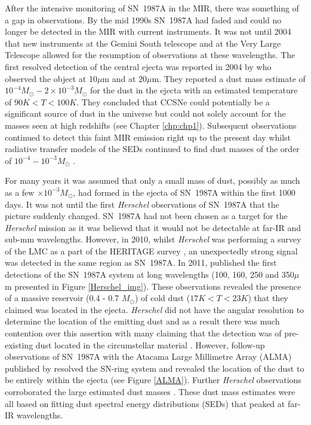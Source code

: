 After the intensive monitoring of SN~1987A in the MIR, there was something of a gap in observations.  By the mid 1990s SN~1987A had faded and could no longer be detected in the MIR with current instruments.  It was not until 2004 that new instruments at the Gemini South telescope and at the Very Large Telescope allowed for the resumption of observations at these wavelengths.  The first resolved detection of the central ejecta was reported in 2004 by \citet{Bouchet2004} who observed the object at 10$\mu$m and at $20\mu$m. They reported a dust mass estimate of $10^{-4}M_{\odot}-2 \times 10^{-3}M_{\odot}$ for the dust in the ejecta with an estimated temperature of $90K<T<100K$.  They concluded that CCSNe could potentially be a significant source of dust in the universe but could not solely account for the masses seen at high redshifts (see Chapter \ref{chp:chp1}).  Subsequent observations continued to detect this faint MIR emission right up to the present day \citep{Dwek2010,Bouchet2014} whilst radiative transfer models of the SEDs continued to find dust masses of the order of $10^{-4}-10^{-3}M_{\odot}$ \citep{Ercolano2007}.

For many years it was assumed that only a small mass of dust, possibly as much as a few $\times 10^{-3}M_{\odot}$, had formed in the ejecta of SN~1987A within the first 1000 days.  It was not until the first \textit{Herschel} observations of SN~1987A that the picture suddenly changed.  SN~1987A had not been chosen as a target for the \textit{Herschel} mission as it was believed that it would not be detectable at far-IR and sub-mm wavelengths.  However, in 2010, whilst \textit{Herschel} was performing a survey of the LMC as a part of the HERITAGE survey \citep{Meixner2013}, an unexpectedly strong signal was detected in the same region as SN~1987A.  In 2011, \citet{Matsuura2011} published the first detections of the SN~1987A system at long wavelengths (100, 160, 250 and 350$\mu$m presented in Figure \ref{Herschel_img}).  These observations revealed the presence of a massive reservoir (0.4 - 0.7 $M_{\odot}$) of cold dust ($17K<T<23K$) that they claimed was located in the ejecta.  \textit{Herschel} did not have the angular resolution to determine the location of the emitting dust and as a result there was much contention over this assertion with many claiming that the detection was of pre-existing dust located in the circumstellar material \citep{Bouchet2014}.  However, follow-up observations of SN~1987A with the Atacama Large Millimetre Array (ALMA) published by \citet{Indebetouw2014} resolved the SN-ring system and revealed the location of the dust to be entirely within the ejecta (see Figure \ref{ALMA}).  Further \textit{Herschel} observations corroborated the large estimated dust masses \citep{Matsuura2015}.  These dust mass estimates were all based on fitting dust spectral energy distributions (SEDs) that peaked at far-IR wavelengths.

